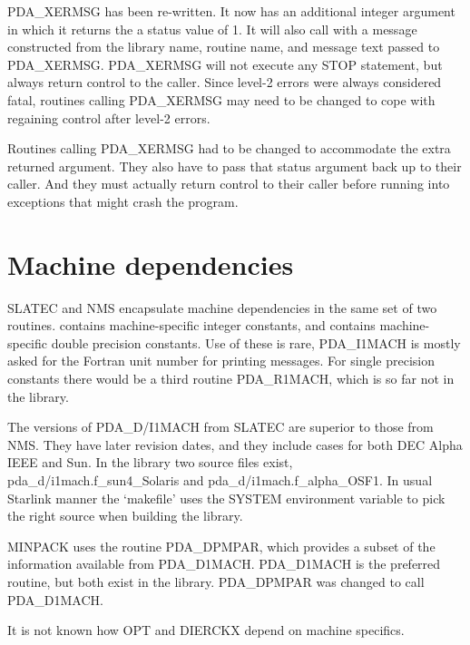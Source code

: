 \documentclass[11pt,twoside,nolof]{starlink}
\begin{document}
   PDA\_XERMSG has been re-written. It now has an additional integer argument
   in which it returns the a status value of 1. It will
   also call
   with a message constructed from the library name, routine name, and
   message text passed to PDA\_XERMSG. PDA\_XERMSG will not execute any STOP
   statement, but always return control to the caller. Since level-2
   errors were always considered fatal, routines calling PDA\_XERMSG may need
   to be changed to cope with regaining control after level-2 errors.

   Routines calling PDA\_XERMSG had to be changed to accommodate the extra
   returned argument. They also have to pass that status argument back
   up to their caller. And they must actually return control to their
   caller before running into exceptions that might crash the program.


\section{Machine dependencies}

   SLATEC and NMS encapsulate machine dependencies in the same set of
   two routines.
   contains machine-specific integer constants, and
   contains machine-specific double precision constants. Use of these is
   rare, PDA\_I1MACH is mostly asked for the Fortran unit number for printing
   messages. For single precision constants there would be a third
   routine PDA\_R1MACH, which is so far not in the library.

   The versions of PDA\_D/I1MACH from SLATEC are superior to those from NMS.
   They have later revision dates, and they include cases for both DEC
   Alpha IEEE and Sun. In the library two source files exist,
   pda\_d/i1mach.f\_sun4\_Solaris and pda\_d/i1mach.f\_alpha\_OSF1. In
   usual Starlink manner the `makefile' uses the SYSTEM environment
   variable to pick the right source when building the library.

   MINPACK uses the routine PDA\_DPMPAR, which provides a subset of the
   information available from PDA\_D1MACH. PDA\_D1MACH is the preferred
   routine, but both exist in the library. PDA\_DPMPAR was changed to
   call PDA\_D1MACH.

   It is not known how OPT and DIERCKX depend on machine specifics.
\end{document}
